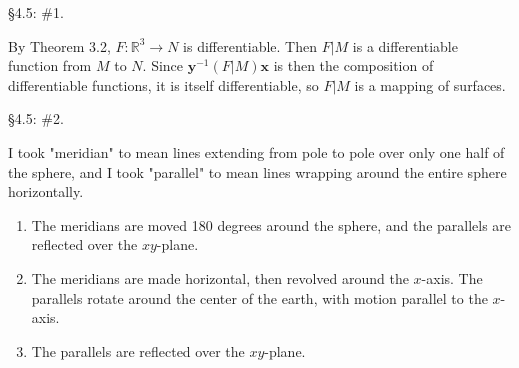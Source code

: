 \documentclass[10pt]{report}
\begin{document}
\begin{exer}[]
\S 4.5: \#1.
\end{exer}
By Theorem 3.2, $F:\mathbb{R}^3\to N$ is differentiable. Then $F|M$ is a differentiable function from $M$ to $N$. Since $\mathbf{y}^{-1}(F|M)\mathbf{x}$ is then the composition of differentiable functions, it is itself differentiable, so $F|M$ is a mapping of surfaces.

\begin{exer}[]
\S 4.5: \#2.
\end{exer}
I took "meridian" to mean lines extending from pole to pole over only one half of the sphere, and I took "parallel" to mean lines wrapping around the entire sphere horizontally.

\begin{enumerate}
	\item The meridians are moved 180 degrees around the sphere, and the parallels are reflected over the $xy$-plane.
	\item The meridians are made horizontal, then revolved around the $x$-axis. The parallels rotate around the center of the earth, with motion parallel to the $x$-axis.
	\item The parallels are reflected over the $xy$-plane.
\end{enumerate}
\end{document}
